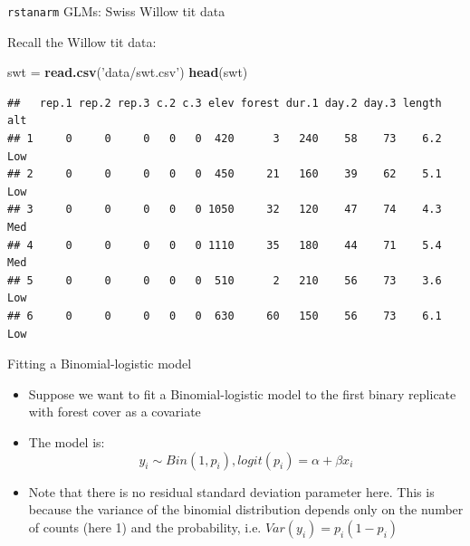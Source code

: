 \documentclass[ignorenonframetext,]{beamer}
\newenvironment{Shaded}{\begin{snugshade}}{\end{snugshade}}
\newcommand{\KeywordTok}[1]{\textcolor[rgb]{0.13,0.29,0.53}{\textbf{#1}}}
\newcommand{\StringTok}[1]{\textcolor[rgb]{0.31,0.60,0.02}{#1}}
\newcommand{\NormalTok}[1]{#1}
\begin{document}
\begin{frame}[fragile]{\texttt{rstanarm} GLMs: Swiss Willow tit data}

Recall the Willow tit data: \tiny

\begin{Shaded}
\begin{Highlighting}[]
\NormalTok{swt =}\StringTok{ }\KeywordTok{read.csv}\NormalTok{(}\StringTok{'data/swt.csv'}\NormalTok{)}
\KeywordTok{head}\NormalTok{(swt)}
\end{Highlighting}
\end{Shaded}

\begin{verbatim}
##   rep.1 rep.2 rep.3 c.2 c.3 elev forest dur.1 day.2 day.3 length alt
## 1     0     0     0   0   0  420      3   240    58    73    6.2 Low
## 2     0     0     0   0   0  450     21   160    39    62    5.1 Low
## 3     0     0     0   0   0 1050     32   120    47    74    4.3 Med
## 4     0     0     0   0   0 1110     35   180    44    71    5.4 Med
## 5     0     0     0   0   0  510      2   210    56    73    3.6 Low
## 6     0     0     0   0   0  630     60   150    56    73    6.1 Low
\end{verbatim}

\normalsize

\end{frame}

\begin{frame}{Fitting a Binomial-logistic model}

\begin{itemize}
\item
  Suppose we want to fit a Binomial-logistic model to the first binary
  replicate with forest cover as a covariate
\item
  The model is:
  \[y_i \sim Bin(1, p_i), logit(p_i) = \alpha + \beta x_i\]
\item
  Note that there is no residual standard deviation parameter here. This
  is because the variance of the binomial distribution depends only on
  the number of counts (here 1) and the probability, i.e.
  \(Var(y_i) = p_i (1 - p_i)\)
\end{itemize}

\end{frame}
\end{document}
